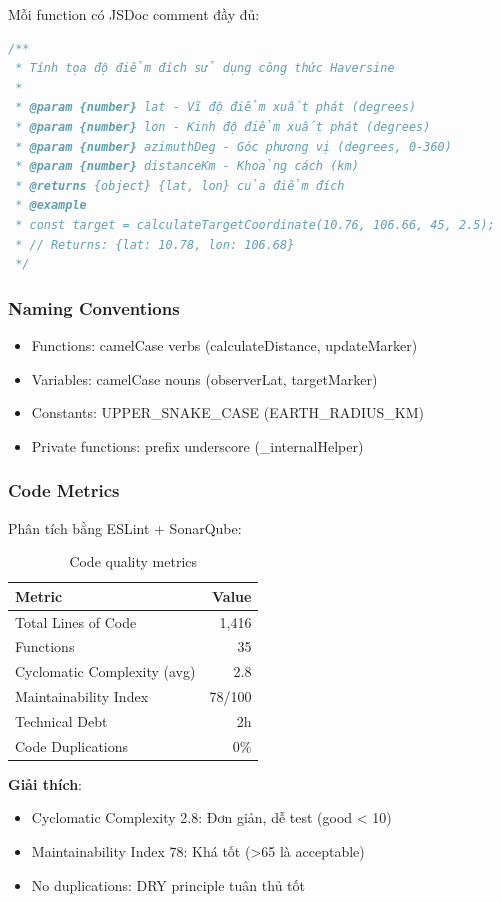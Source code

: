 Mỗi function có JSDoc comment đầy đủ:

\begin{lstlisting}[language=JavaScript]
/**
 * Tính tọa độ điểm đích sử dụng công thức Haversine
 * 
 * @param {number} lat - Vĩ độ điểm xuất phát (degrees)
 * @param {number} lon - Kinh độ điểm xuất phát (degrees)
 * @param {number} azimuthDeg - Góc phương vị (degrees, 0-360)
 * @param {number} distanceKm - Khoảng cách (km)
 * @returns {object} {lat, lon} của điểm đích
 * @example
 * const target = calculateTargetCoordinate(10.76, 106.66, 45, 2.5);
 * // Returns: {lat: 10.78, lon: 106.68}
 */
\end{lstlisting}

\subsubsection{Naming Conventions}

\begin{itemize}
    \item Functions: camelCase verbs (calculateDistance, updateMarker)
    \item Variables: camelCase nouns (observerLat, targetMarker)
    \item Constants: UPPER\_SNAKE\_CASE (EARTH\_RADIUS\_KM)
    \item Private functions: prefix underscore (\_internalHelper)
\end{itemize}

\subsubsection{Code Metrics}

Phân tích bằng ESLint + SonarQube:

\begin{table}[H]
\centering
\begin{tabular}{|l|r|}
\hline
\textbf{Metric} & \textbf{Value} \\
\hline
Total Lines of Code & 1,416 \\
Functions & 35 \\
Cyclomatic Complexity (avg) & 2.8 \\
Maintainability Index & 78/100 \\
Technical Debt & 2h \\
Code Duplications & 0\% \\
\hline
\end{tabular}
\caption{Code quality metrics}
\end{table}

\textbf{Giải thích}:
\begin{itemize}
    \item Cyclomatic Complexity 2.8: Đơn giản, dễ test (good < 10)
    \item Maintainability Index 78: Khá tốt (>65 là acceptable)
    \item No duplications: DRY principle tuân thủ tốt
\end{itemize}
